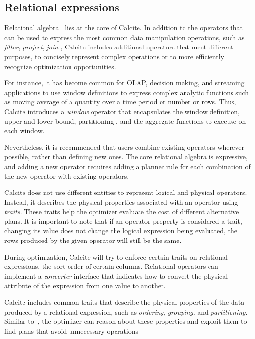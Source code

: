 \subsection{Relational expressions}
\label{subsec:relexprs}

Relational algebra~\cite{DBLP:journals/cacm/Codd70} lies at the core of Calcite. In addition to the operators that can be used to express the most common data manipulation operations, such as \textit{filter}, \textit{project}, \textit{join} \etc , Calcite includes additional operators that meet different purposes, \eg to concisely represent complex operations or to more efficiently recognize optimization opportunities.

For instance, it has become common for OLAP, decision making, and streaming applications to use window definitions to express complex analytic functions such as moving average of a quantity over a time period or number or rows.  Thus, Calcite introduces a \textit{window} operator that encapsulates the window definition, \ie upper and lower bound, partitioning \etc, and the aggregate functions to execute on each window.

Nevertheless, it is recommended that users combine existing operators wherever possible, rather than defining new ones. The core relational algebra is expressive, and adding a new operator requires adding a planner rule for each combination of the new operator with existing operators.

 Calcite does not use different entities to represent logical and physical operators. Instead, it describes the physical properties associated with an operator using \textit{traits}. These traits help the optimizer evaluate the cost of different alternative plans. It is important to note that if an operator property is considered a trait, changing its value does not change the logical expression being evaluated, \ie the rows produced by the given operator will still be the same.

During optimization, Calcite will try to enforce certain traits on relational expressions, \eg the sort order of certain columns. Relational operators can implement a \textit{converter} interface that indicates how to convert the physical attribute of the expression from one value to another.

Calcite includes common traits that describe the physical properties of the data produced by a relational expression, such as \textit{ordering}, \textit{grouping}, and \textit{partitioning}. Similar to~\cite{DBLP:conf/icde/ZhouLC10}, the optimizer can reason about these properties and exploit them to find plans that avoid unnecessary operations.

